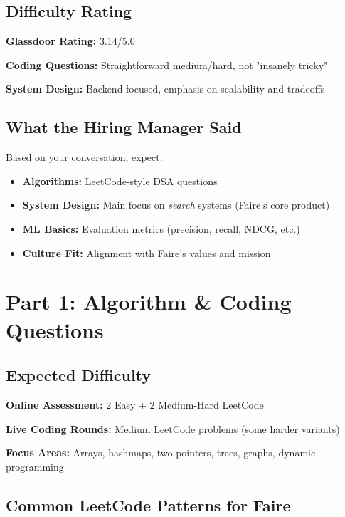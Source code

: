 \documentclass[11pt,letterpaper]{article}
\begin{document}
\subsection{Difficulty Rating}

\textbf{Glassdoor Rating:} 3.14/5.0

\textbf{Coding Questions:} Straightforward medium/hard, not "insanely tricky"

\textbf{System Design:} Backend-focused, emphasis on scalability and tradeoffs

\subsection{What the Hiring Manager Said}

Based on your conversation, expect:
\begin{itemize}
    \item \textbf{Algorithms:} LeetCode-style DSA questions
    \item \textbf{System Design:} Main focus on \textit{search} systems (Faire's core product)
    \item \textbf{ML Basics:} Evaluation metrics (precision, recall, NDCG, etc.)
    \item \textbf{Culture Fit:} Alignment with Faire's values and mission
\end{itemize}

\section{Part 1: Algorithm \& Coding Questions}

\subsection{Expected Difficulty}

\textbf{Online Assessment:} 2 Easy + 2 Medium-Hard LeetCode

\textbf{Live Coding Rounds:} Medium LeetCode problems (some harder variants)

\textbf{Focus Areas:} Arrays, hashmaps, two pointers, trees, graphs, dynamic programming

\subsection{Common LeetCode Patterns for Faire}
\end{document}
